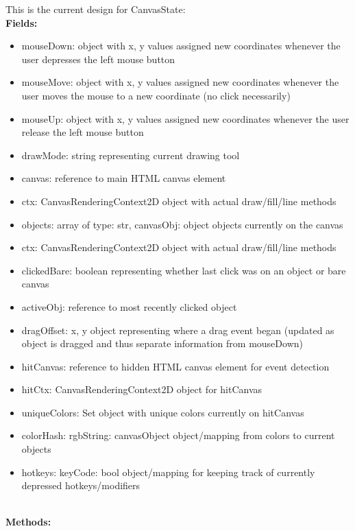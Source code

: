 \documentclass{article}
\begin{document}
This is the current design for CanvasState:
\\\textbf{Fields:}
\begin{itemize}
\item mouseDown: object with x, y values assigned new coordinates whenever the
user depresses the left mouse button
\item mouseMove: object with x, y values assigned new coordinates whenever the
user moves the mouse to a new coordinate (no click necessarily)
\item mouseUp: object with x, y values assigned new coordinates whenever the
user release the left mouse button
\item drawMode: string representing current drawing tool
\item canvas: reference to main HTML canvas element
\item ctx: CanvasRenderingContext2D object with actual draw/fill/line methods
\item objects: array of {type: str, canvasObj: object} objects currently on the canvas
\item ctx: CanvasRenderingContext2D object with actual draw/fill/line methods
\item clickedBare: boolean representing whether last click was on an object or bare canvas
\item activeObj: reference to most recently clicked object
\item dragOffset: x, y object representing where a drag event began (updated as object is dragged
and thus separate information from mouseDown)
\item hitCanvas: reference to hidden HTML canvas element for event detection
\item hitCtx: CanvasRenderingContext2D object for hitCanvas
\item uniqueColors: Set object with unique colors currently on hitCanvas
\item colorHash: {rgbString: canvasObject} object/mapping from colors to current objects
\item hotkeys: {keyCode: bool} object/mapping for keeping track of currently depressed hotkeys/modifiers
\end{itemize}
~\\\textbf{Methods:}
\end{document}
